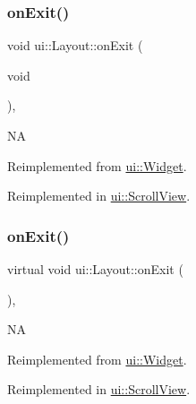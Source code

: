 \subsubsection{\texorpdfstring{on\+Exit()}{onExit()}\hspace{0.1cm}{\footnotesize\ttfamily [1/2]}}
{\footnotesize\ttfamily void ui\+::\+Layout\+::on\+Exit (\begin{DoxyParamCaption}\item[{void}]{ }\end{DoxyParamCaption})\hspace{0.3cm}{\ttfamily [override]}, {\ttfamily [virtual]}}

NA 

Reimplemented from \hyperlink{classui_1_1Widget_a91cbac90873d76b6edb0e41eed5477eb}{ui\+::\+Widget}.



Reimplemented in \hyperlink{classui_1_1ScrollView_a9c9bf9f6d171a618d57c369e53d91a25}{ui\+::\+Scroll\+View}.

\mbox{\label{classui_1_1Layout_ad6be3b3eb4ca53dcbd3eb1ca966299ff}} 
\subsubsection{\texorpdfstring{on\+Exit()}{onExit()}\hspace{0.1cm}{\footnotesize\ttfamily [2/2]}}
{\footnotesize\ttfamily virtual void ui\+::\+Layout\+::on\+Exit (\begin{DoxyParamCaption}{ }\end{DoxyParamCaption})\hspace{0.3cm}{\ttfamily [override]}, {\ttfamily [virtual]}}

NA 

Reimplemented from \hyperlink{classui_1_1Widget_a91cbac90873d76b6edb0e41eed5477eb}{ui\+::\+Widget}.



Reimplemented in \hyperlink{classui_1_1ScrollView_a9c9bf9f6d171a618d57c369e53d91a25}{ui\+::\+Scroll\+View}.

\mbox{\label{classui_1_1Layout_ade484ea5501c2866bf72bd35d6aa14ff}} 
